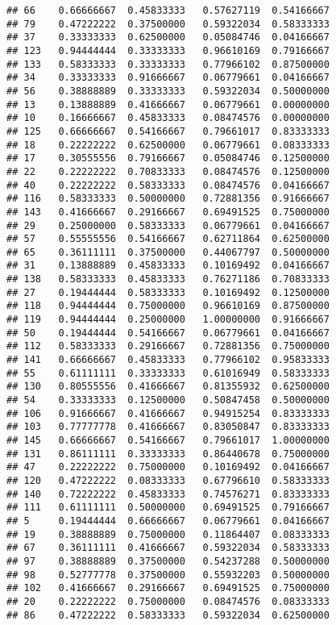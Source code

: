 \documentclass[
]{article}
\begin{document}
\begin{verbatim}
## 66    0.66666667  0.45833333   0.57627119  0.54166667
## 79    0.47222222  0.37500000   0.59322034  0.58333333
## 37    0.33333333  0.62500000   0.05084746  0.04166667
## 123   0.94444444  0.33333333   0.96610169  0.79166667
## 133   0.58333333  0.33333333   0.77966102  0.87500000
## 34    0.33333333  0.91666667   0.06779661  0.04166667
## 56    0.38888889  0.33333333   0.59322034  0.50000000
## 13    0.13888889  0.41666667   0.06779661  0.00000000
## 10    0.16666667  0.45833333   0.08474576  0.00000000
## 125   0.66666667  0.54166667   0.79661017  0.83333333
## 18    0.22222222  0.62500000   0.06779661  0.08333333
## 17    0.30555556  0.79166667   0.05084746  0.12500000
## 22    0.22222222  0.70833333   0.08474576  0.12500000
## 40    0.22222222  0.58333333   0.08474576  0.04166667
## 116   0.58333333  0.50000000   0.72881356  0.91666667
## 143   0.41666667  0.29166667   0.69491525  0.75000000
## 29    0.25000000  0.58333333   0.06779661  0.04166667
## 57    0.55555556  0.54166667   0.62711864  0.62500000
## 65    0.36111111  0.37500000   0.44067797  0.50000000
## 31    0.13888889  0.45833333   0.10169492  0.04166667
## 138   0.58333333  0.45833333   0.76271186  0.70833333
## 27    0.19444444  0.58333333   0.10169492  0.12500000
## 118   0.94444444  0.75000000   0.96610169  0.87500000
## 119   0.94444444  0.25000000   1.00000000  0.91666667
## 50    0.19444444  0.54166667   0.06779661  0.04166667
## 112   0.58333333  0.29166667   0.72881356  0.75000000
## 141   0.66666667  0.45833333   0.77966102  0.95833333
## 55    0.61111111  0.33333333   0.61016949  0.58333333
## 130   0.80555556  0.41666667   0.81355932  0.62500000
## 54    0.33333333  0.12500000   0.50847458  0.50000000
## 106   0.91666667  0.41666667   0.94915254  0.83333333
## 103   0.77777778  0.41666667   0.83050847  0.83333333
## 145   0.66666667  0.54166667   0.79661017  1.00000000
## 131   0.86111111  0.33333333   0.86440678  0.75000000
## 47    0.22222222  0.75000000   0.10169492  0.04166667
## 120   0.47222222  0.08333333   0.67796610  0.58333333
## 140   0.72222222  0.45833333   0.74576271  0.83333333
## 111   0.61111111  0.50000000   0.69491525  0.79166667
## 5     0.19444444  0.66666667   0.06779661  0.04166667
## 19    0.38888889  0.75000000   0.11864407  0.08333333
## 67    0.36111111  0.41666667   0.59322034  0.58333333
## 97    0.38888889  0.37500000   0.54237288  0.50000000
## 98    0.52777778  0.37500000   0.55932203  0.50000000
## 102   0.41666667  0.29166667   0.69491525  0.75000000
## 20    0.22222222  0.75000000   0.08474576  0.08333333
## 86    0.47222222  0.58333333   0.59322034  0.62500000

\end{verbatim}
\end{document}
